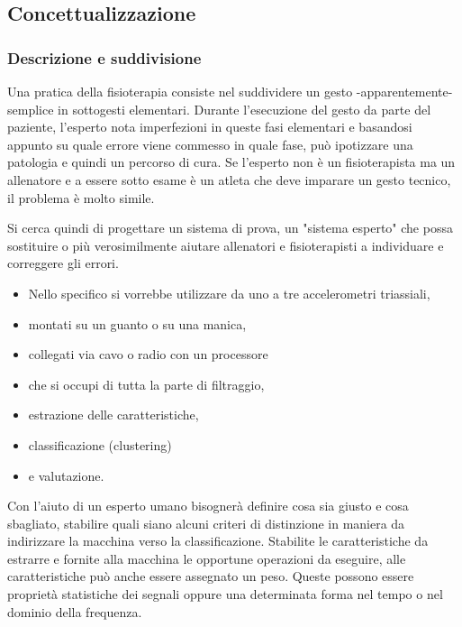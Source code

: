 	\subsection{Concettualizzazione}
	
	\subsubsection{Descrizione e suddivisione}
	Una pratica della fisioterapia consiste nel suddividere un gesto -apparentemente- semplice in sottogesti elementari.
	Durante l'esecuzione del gesto da parte del paziente,
	l'esperto nota imperfezioni in queste fasi elementari
	e basandosi appunto su quale errore viene commesso in quale fase,
	pu\`o ipotizzare una patologia e quindi un percorso di cura.
	Se l'esperto non \`e un fisioterapista ma un allenatore
	e a essere sotto esame \`e un atleta che deve imparare
	un gesto tecnico, il problema \`e molto simile.
	
	Si cerca quindi di progettare un sistema di prova,
	un "sistema esperto" che possa sostituire
	o pi\`u verosimilmente aiutare allenatori e fisioterapisti
	a individuare e correggere gli errori.
	
	\begin {itemize}
	\item [Acquisizione] Nello specifico si vorrebbe utilizzare da uno a tre accelerometri triassiali,
	\item [Montaggio] {montati su un guanto o su una manica,}
	\item [Collegamenti] collegati via cavo o radio con un processore
	\item [Elaborazione 1] che si occupi di tutta la parte di filtraggio,
	\item [Elaborazione 2] estrazione delle caratteristiche,
	\item [Elaborazione 3] classificazione (clustering)
	\item [Elaborazione 4] e valutazione.
	\end {itemize}
	
	Con l'aiuto di un esperto umano
	bisogner\`a definire cosa sia giusto e cosa sbagliato,
	stabilire quali siano alcuni criteri di distinzione
	in maniera da indirizzare la macchina verso la classificazione.
	Stabilite le caratteristiche da estrarre
	e fornite alla macchina le opportune operazioni da eseguire,
	alle caratteristiche pu\`o anche essere assegnato un peso.
	Queste possono essere propriet\`a statistiche dei segnali
	oppure una determinata forma nel tempo
	o nel dominio della frequenza.
	
